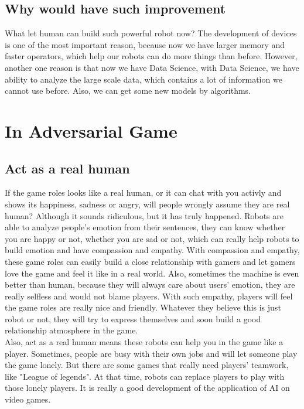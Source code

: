 \documentclass[12pt]{article}
\begin{document}
        \subsection{Why would have such improvement}
            What let human can build such powerful robot now? The development of devices is one of the
            most important reason, because now we have larger memory and faster operators, which
            help our robots can do more things than before. However, another one reason is that
            now we have Data Science, with Data Science, we have ability to analyze the large scale
            data, which contains a lot of information we cannot use before. Also, we can get some
            new models by algorithms.
    \section{In Adversarial Game}
        \subsection{Act as a real human}
            If the game roles looks like a real human, or it can chat with you activly and shows its
            happiness, sadness or angry, will people wrongly assume they are real human? Although it
            sounds ridiculous, but it has truly happened. Robots are able to analyze people's emotion
            from their sentences, they can know whether you are happy or not, whether you are sad or
            not, which can really help robots to build emotion and have compassion and empathy. With
            compassion and empathy, these game roles can easily build a close relationship with gamers
            and let gamers love the game and feel it like in a real world. Also, sometimes the machine
            is even better than human, because they will always care about users' emotion, they are
            really selfless and would not blame players. With such empathy, players will feel the
            game roles are really nice and friendly. Whatever they believe this is just robot or not,
            they will try to express themselves and soon build a good relationship atmosphere in the
            game.\\
            
            Also, act as a real human means these robots can help you in the game like a player.
            Sometimes, people are busy with their own jobs and will let someone play the game lonely.
            But there are some games that really need players' teamwork, like "League of legends".
            At that time, robots can replace players to play with those lonely players. It is really
            a good development of the application of AI on video games.
\end{document}
